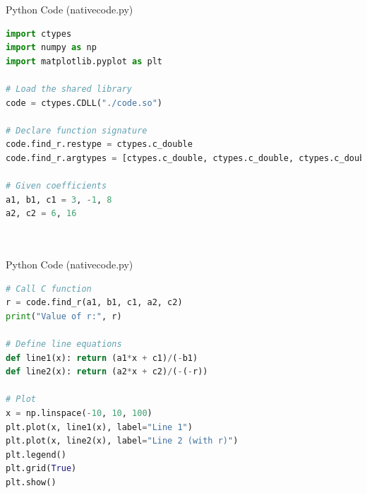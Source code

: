 \documentclass{beamer}
\begin{document}
\begin{frame}[fragile]{Python Code (nativecode.py)}
\begin{lstlisting}[language=Python]
import ctypes
import numpy as np
import matplotlib.pyplot as plt

# Load the shared library
code = ctypes.CDLL("./code.so")

# Declare function signature
code.find_r.restype = ctypes.c_double
code.find_r.argtypes = [ctypes.c_double, ctypes.c_double, ctypes.c_double, ctypes.c_double, ctypes.c_double]

# Given coefficients
a1, b1, c1 = 3, -1, 8
a2, c2 = 6, 16




\end{lstlisting}
\end{frame}

\begin{frame}[fragile]{Python Code (nativecode.py)}
\begin{lstlisting}[language=Python]
# Call C function
r = code.find_r(a1, b1, c1, a2, c2)
print("Value of r:", r)

# Define line equations
def line1(x): return (a1*x + c1)/(-b1)
def line2(x): return (a2*x + c2)/(-(-r))

# Plot
x = np.linspace(-10, 10, 100)
plt.plot(x, line1(x), label="Line 1")
plt.plot(x, line2(x), label="Line 2 (with r)")
plt.legend()
plt.grid(True)
plt.show()

\end{lstlisting}
\end{frame}
\end{document}
